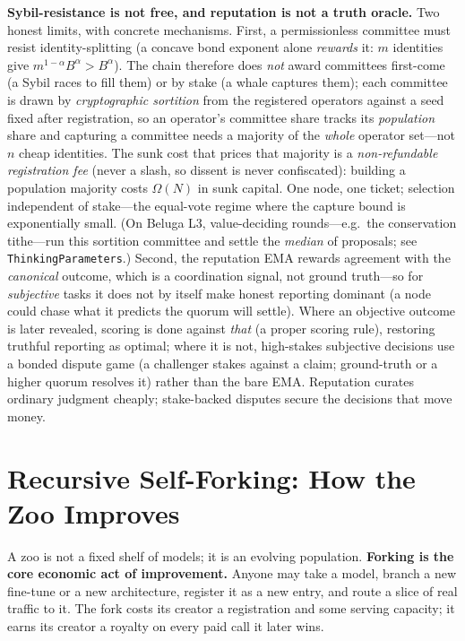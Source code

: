 \documentclass[11pt]{article}
\begin{document}
\textbf{Sybil-resistance is not free, and reputation is not a truth oracle.} Two honest limits, with concrete mechanisms. First, a permissionless committee must resist identity-splitting (a concave bond exponent alone \emph{rewards} it: $m$ identities give $m^{1-\alpha}B^\alpha>B^\alpha$). The chain therefore does \emph{not} award committees first-come (a Sybil races to fill them) or by stake (a whale captures them); each committee is drawn by \emph{cryptographic sortition} from the registered operators against a seed fixed after registration, so an operator's committee share tracks its \emph{population} share and capturing a committee needs a majority of the \emph{whole} operator set---not $n$ cheap identities. The sunk cost that prices that majority is a \emph{non-refundable registration fee} (never a slash, so dissent is never confiscated): building a population majority costs $\Omega(N)$ in sunk capital. One node, one ticket; selection independent of stake---the equal-vote regime where the capture bound is exponentially small. (On Beluga L3, value-deciding rounds---e.g.\ the conservation tithe---run this sortition committee and settle the \emph{median} of proposals; see \texttt{ThinkingParameters}.) Second, the reputation EMA rewards agreement with the \emph{canonical} outcome, which is a coordination signal, not ground truth---so for \emph{subjective} tasks it does not by itself make honest reporting dominant (a node could chase what it predicts the quorum will settle). Where an objective outcome is later revealed, scoring is done against \emph{that} (a proper scoring rule), restoring truthful reporting as optimal; where it is not, high-stakes subjective decisions use a bonded dispute game (a challenger stakes against a claim; ground-truth or a higher quorum resolves it) rather than the bare EMA. Reputation curates ordinary judgment cheaply; stake-backed disputes secure the decisions that move money.

\section{Recursive Self-Forking: How the Zoo Improves}

A zoo is not a fixed shelf of models; it is an evolving population. \textbf{Forking is the core economic act of improvement.} Anyone may take a model, branch a new fine-tune or a new architecture, register it as a new entry, and route a slice of real traffic to it. The fork costs its creator a registration and some serving capacity; it earns its creator a royalty on every paid call it later wins.
\end{document}
